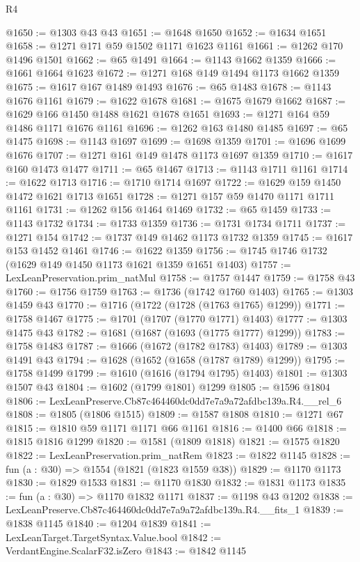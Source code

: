 \begin{lexlean}{R4}
\begin{coremodule}
@1650 := @1303 @43 @43
@1651 := @1648 @1650
@1652 := @1634 @1651
@1658 := @1271 @171 @59 @1502 @1171 @1623 @1161
@1661 := @1262 @170 @1496 @1501
@1662 := @65 @1491
@1664 := @1143 @1662 @1359
@1666 := @1661 @1664 @1623
@1672 := @1271 @168 @149 @1494 @1173 @1662 @1359
@1675 := @1617 @167 @1489 @1493
@1676 := @65 @1483
@1678 := @1143 @1676 @1161
@1679 := @1622 @1678
@1681 := @1675 @1679 @1662
@1687 := @1629 @166 @1450 @1488 @1621 @1678 @1651
@1693 := @1271 @164 @59 @1486 @1171 @1676 @1161
@1696 := @1262 @163 @1480 @1485
@1697 := @65 @1475
@1698 := @1143 @1697
@1699 := @1698 @1359
@1701 := @1696 @1699 @1676
@1707 := @1271 @161 @149 @1478 @1173 @1697 @1359
@1710 := @1617 @160 @1473 @1477
@1711 := @65 @1467
@1713 := @1143 @1711 @1161
@1714 := @1622 @1713
@1716 := @1710 @1714 @1697
@1722 := @1629 @159 @1450 @1472 @1621 @1713 @1651
@1728 := @1271 @157 @59 @1470 @1171 @1711 @1161
@1731 := @1262 @156 @1464 @1469
@1732 := @65 @1459
@1733 := @1143 @1732
@1734 := @1733 @1359
@1736 := @1731 @1734 @1711
@1737 := @1271 @154
@1742 := @1737 @149 @1462 @1173 @1732 @1359
@1745 := @1617 @153 @1452 @1461
@1746 := @1622 @1359
@1756 := @1745 @1746 @1732 (@1629 @149 @1450 @1173 @1621 @1359 @1651 @1403)
@1757 := LexLeanPreservation.prim_natMul
@1758 := @1757 @1447
@1759 := @1758 @43
@1760 := @1756 @1759
@1763 := @1736 (@1742 @1760 @1403)
@1765 := @1303 @1459 @43
@1770 := @1716 (@1722 (@1728 (@1763 @1765) @1299))
@1771 := @1758 @1467
@1775 := @1701 (@1707 (@1770 @1771) @1403)
@1777 := @1303 @1475 @43
@1782 := @1681 (@1687 (@1693 (@1775 @1777) @1299))
@1783 := @1758 @1483
@1787 := @1666 (@1672 (@1782 @1783) @1403)
@1789 := @1303 @1491 @43
@1794 := @1628 (@1652 (@1658 (@1787 @1789) @1299))
@1795 := @1758 @1499
@1799 := @1610 (@1616 (@1794 @1795) @1403)
@1801 := @1303 @1507 @43
@1804 := @1602 (@1799 @1801) @1299
@1805 := @1596 @1804
@1806 := LexLeanPreserve.Cb87c464460dc0dd7e7a9a72afdbc139a.R4.__rel_6
@1808 := @1805 (@1806 @1515)
@1809 := @1587 @1808
@1810 := @1271 @67
@1815 := @1810 @59 @1171 @1171 @66 @1161
@1816 := @1400 @66
@1818 := @1815 @1816 @1299
@1820 := @1581 (@1809 @1818)
@1821 := @1575 @1820
@1822 := LexLeanPreservation.prim_natRem
@1823 := @1822 @1145
@1828 := fun (a : @30) => @1554 (@1821 (@1823 @1559 @38))
@1829 := @1170 @1173
@1830 := @1829 @1533
@1831 := @1170 @1830
@1832 := @1831 @1173
@1835 := fun (a : @30) => @1170 @1832 @1171
@1837 := @1198 @43 @1202
@1838 := LexLeanPreserve.Cb87c464460dc0dd7e7a9a72afdbc139a.R4.__fits_1
@1839 := @1838 @1145
@1840 := @1204 @1839
@1841 := LexLeanTarget.TargetSyntax.Value.bool
@1842 := VerdantEngine.ScalarF32.isZero
@1843 := @1842 @1145

\end{coremodule}
\end{lexlean}
